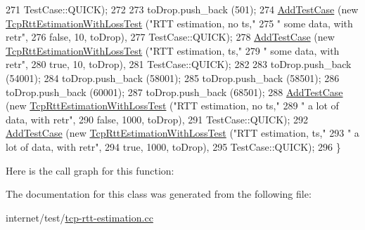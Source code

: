 \begin{DoxyCode}
271                  TestCase::QUICK);
272 
273     toDrop.push\_back (501);
274     \hyperlink{classns3_1_1TestCase_a3718088e3eefd5d6454569d2e0ddd835}{AddTestCase} (\textcolor{keyword}{new} \hyperlink{classTcpRttEstimationWithLossTest}{TcpRttEstimationWithLossTest} (\textcolor{stringliteral}{"RTT estimation,
       no ts,"}
275                                                    \textcolor{stringliteral}{" some data, with retr"},
276                                                    \textcolor{keyword}{false}, 10, toDrop),
277                  TestCase::QUICK);
278     \hyperlink{classns3_1_1TestCase_a3718088e3eefd5d6454569d2e0ddd835}{AddTestCase} (\textcolor{keyword}{new} \hyperlink{classTcpRttEstimationWithLossTest}{TcpRttEstimationWithLossTest} (\textcolor{stringliteral}{"RTT estimation,
       ts,"}
279                                                    \textcolor{stringliteral}{" some data, with retr"},
280                                                    \textcolor{keyword}{true}, 10, toDrop),
281                  TestCase::QUICK);
282 
283     toDrop.push\_back (54001);
284     toDrop.push\_back (58001);
285     toDrop.push\_back (58501);
286     toDrop.push\_back (60001);
287     toDrop.push\_back (68501);
288     \hyperlink{classns3_1_1TestCase_a3718088e3eefd5d6454569d2e0ddd835}{AddTestCase} (\textcolor{keyword}{new} \hyperlink{classTcpRttEstimationWithLossTest}{TcpRttEstimationWithLossTest} (\textcolor{stringliteral}{"RTT estimation,
       no ts,"}
289                                                    \textcolor{stringliteral}{" a lot of data, with retr"},
290                                                    \textcolor{keyword}{false}, 1000, toDrop),
291                  TestCase::QUICK);
292     \hyperlink{classns3_1_1TestCase_a3718088e3eefd5d6454569d2e0ddd835}{AddTestCase} (\textcolor{keyword}{new} \hyperlink{classTcpRttEstimationWithLossTest}{TcpRttEstimationWithLossTest} (\textcolor{stringliteral}{"RTT estimation,
       ts,"}
293                                                    \textcolor{stringliteral}{" a lot of data, with retr"},
294                                                    \textcolor{keyword}{true}, 1000, toDrop),
295                  TestCase::QUICK);
296   \}
\end{DoxyCode}


Here is the call graph for this function\+:




The documentation for this class was generated from the following file\+:\begin{DoxyCompactItemize}
\item 
internet/test/\hyperlink{tcp-rtt-estimation_8cc}{tcp-\/rtt-\/estimation.\+cc}\end{DoxyCompactItemize}
